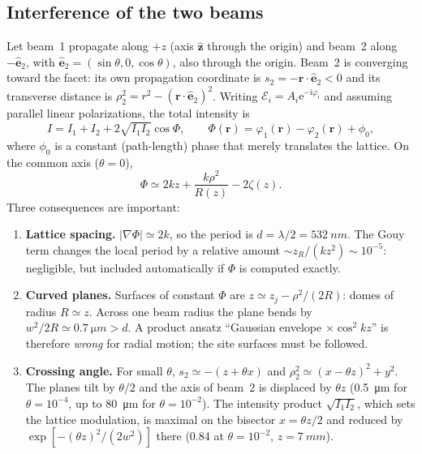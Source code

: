 \documentclass[11pt,a4paper]{article}
\newcommand{\ee}{\mathrm{e}}
\newcommand{\ii}{\mathrm{i}}
\begin{document}
\subsection{Interference of the two beams}
Let beam~1 propagate along $+z$ (axis $\hat{\bm z}$ through the origin) and beam~2 along $-\hat{\bm e}_2$, with $\hat{\bm e}_2=(\sin\theta,0,\cos\theta)$, also through the origin. Beam~2 is converging toward the facet: its own propagation coordinate is $s_2=-\bm r\cdot\hat{\bm e}_2<0$ and its transverse distance is $\rho_2^2=r^2-(\bm r\cdot\hat{\bm e}_2)^2$. Writing $\mathcal E_i=A_i\ee^{-\ii\varphi_i}$ and assuming parallel linear polarizations, the total intensity is
\begin{equation}
I = I_1+I_2+2\sqrt{I_1I_2}\cos\Phi,\qquad \Phi(\bm r)=\varphi_1(\bm r)-\varphi_2(\bm r)+\phi_0 ,
\end{equation}
where $\phi_0$ is a constant (path-length) phase that merely translates the lattice. On the common axis ($\theta=0$),
\begin{equation}
\Phi \simeq 2kz+\frac{k\rho^2}{R(z)}-2\zeta(z).
\label{eq:Phi}
\end{equation}
Three consequences are important:
\begin{enumerate}[leftmargin=*]
\item \textbf{Lattice spacing.} $|\nabla\Phi|\simeq 2k$, so the period is $d=\lambda/2=\SI{532}{nm}$. The Gouy term changes the local period by a relative amount $\sim z_R/(k z^2)\sim10^{-5}$: negligible, but included automatically if $\Phi$ is computed exactly.
\item \textbf{Curved planes.} Surfaces of constant $\Phi$ are $z\simeq z_j-\rho^2/(2R)$: domes of radius $R\simeq z$. Across one beam radius the plane bends by $w^2/2R\simeq\SI{0.7}{\micro m}>d$. A product ansatz ``Gaussian envelope $\times\cos^2 kz$'' is therefore \emph{wrong} for radial motion; the site surfaces must be followed.
\item \textbf{Crossing angle.} For small $\theta$, $s_2\simeq-(z+\theta x)$ and $\rho_2^2\simeq(x-\theta z)^2+y^2$. The planes tilt by $\theta/2$ and the axis of beam~2 is displaced by $\theta z$ (\SI{0.5}{\micro m} for $\theta=10^{-4}$, up to \SI{80}{\micro m} for $\theta=10^{-2}$). The intensity product $\sqrt{I_1I_2}$, which sets the lattice modulation, is maximal on the bisector $x=\theta z/2$ and reduced by $\exp[-(\theta z)^2/(2w^2)]$ there (0.84 at $\theta=10^{-2}$, $z=\SI{7}{mm}$).
\end{enumerate}
\end{document}
